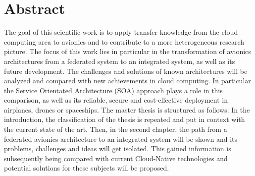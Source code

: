 \documentclass[titlepage]{report}
\begin{document}
\chapter*{Abstract}
The goal of this scientific work is to apply transfer knowledge from the cloud computing area to avionics and to
contribute to a more heterogeneous research picture. The focus of this work lies in particular in the transformation
of avionics architectures from a federated system to an integrated system, as well as its future development.
The challenges and solutions of known architectures will be analyzed and compared with new
achievements in cloud computing. In particular
the Service Orientated Architecture (SOA) approach plays a role in this comparison, as well as its
reliable, secure and cost-effective deployment in airplanes, drones or spaceships.
The master thesis is structured as follows: In the introduction, the classification of the thesis is repeated
and put in context with the current state of the art. Then, in the second chapter, the path from a federated
avionics architecture to an integrated system will be shown and its problems, challenges
and ideas will get isolated. This gained information is subsequently being compared with current Cloud-Native technologies
and potential solutions for these subjects will be proposed.

\tableofcontents
\end{document}
